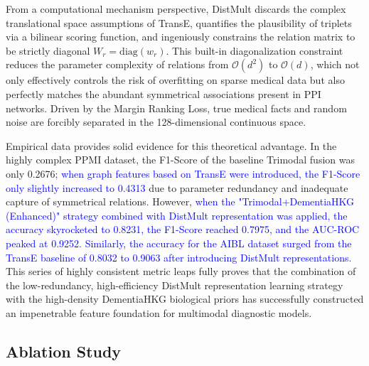 \documentclass[lettersize,journal]{IEEEtran}
\begin{document}
From a computational mechanism perspective, DistMult discards the complex translational space assumptions of TransE, quantifies the plausibility of triplets via a bilinear scoring function, and ingeniously constrains the relation matrix to be strictly diagonal $W_r = \text{diag}(w_r)$. This built-in diagonalization constraint reduces the parameter complexity of relations from $\mathcal{O}(d^2)$ to $\mathcal{O}(d)$, which not only effectively controls the risk of overfitting on sparse medical data but also perfectly matches the abundant symmetrical associations present in PPI networks. Driven by the Margin Ranking Loss, true medical facts and random noise are forcibly separated in the 128-dimensional continuous space.

Empirical data provides solid evidence for this theoretical advantage. In the highly complex PPMI dataset, the F1-Score of the baseline Trimodal fusion was only 0.2676; \textcolor{blue}{when graph features based on TransE were introduced, the F1-Score only slightly increased to 0.4313} due to parameter redundancy and inadequate capture of symmetrical relations. However, \textcolor{blue}{when the "Trimodal+DementiaHKG (Enhanced)" strategy combined with DistMult representation was applied, the accuracy skyrocketed to 0.8231, the F1-Score reached 0.7975, and the AUC-ROC peaked at 0.9252.} \textcolor{blue}{Similarly, the accuracy for the AIBL dataset surged from the TransE baseline of 0.8032 to 0.9063 after introducing DistMult representations.} This series of highly consistent metric leaps fully proves that the combination of the low-redundancy, high-efficiency DistMult representation learning strategy with the high-density DementiaHKG biological priors has successfully constructed an impenetrable feature foundation for multimodal diagnostic models.




\subsection{Ablation Study}
\end{document}
